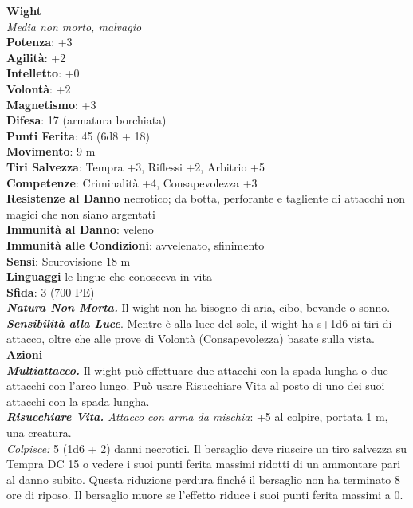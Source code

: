 \begin{multicols}{2}
\medskip\textbf{Wight}\\
\emph{Media non morto, malvagio}\\
\textbf{Potenza}: +3\\
\textbf{Agilità}: +2\\
\textbf{Intelletto}: +0\\
\textbf{Volontà}: +2\\
\textbf{Magnetismo}: +3\\
\textbf{Difesa}: 17 (armatura borchiata)\\
\textbf{Punti Ferita}: 45 (6d8 + 18)\\
\textbf{Movimento}: 9 m\\
\textbf{Tiri Salvezza}: Tempra +3, Riflessi +2, Arbitrio +5\\
\textbf{Competenze}: Criminalità +4, Consapevolezza +3\\
\textbf{Resistenze al Danno} necrotico; da botta, perforante e tagliente di attacchi non magici che non siano argentati \\
\textbf{Immunità al Danno}: veleno\\
\textbf{Immunità alle Condizioni}: avvelenato, sfinimento\\
\textbf{Sensi}: Scurovisione 18 m\\
\textbf{Linguaggi} le lingue che conosceva in vita\\
\textbf{Sfida}: 3 (700 PE)\smallskip\\
\emph{\textbf{Natura Non Morta.}} Il wight non ha bisogno di aria, cibo, bevande o sonno.\\
\emph{\textbf{Sensibilità alla Luce}}. Mentre è alla luce del sole, il wight ha s+1d6 ai tiri di attacco, oltre che alle prove di Volontà (Consapevolezza) basate sulla vista.\\
\smallskip\textbf{Azioni}\\
\emph{\textbf{Multiattacco.}} Il wight può effettuare due attacchi con la spada lungha o due attacchi con l'arco lungo. Può usare Risucchiare Vita al posto di uno dei suoi attacchi con la spada lungha.\\
\emph{\textbf{Risucchiare Vita.} Attacco con arma da mischia}: +5 al colpire, portata 1 m, una creatura.\\
\emph{Colpisce:} 5 (1d6 + 2) danni necrotici. Il bersaglio deve riuscire un tiro salvezza su Tempra DC  15 o vedere i suoi punti ferita massimi ridotti di un ammontare pari al danno subito. Questa riduzione perdura finché il bersaglio non ha terminato 8 ore di riposo. Il bersaglio muore se l'effetto riduce i suoi punti ferita massimi a 0.\\


\end{multicols}

